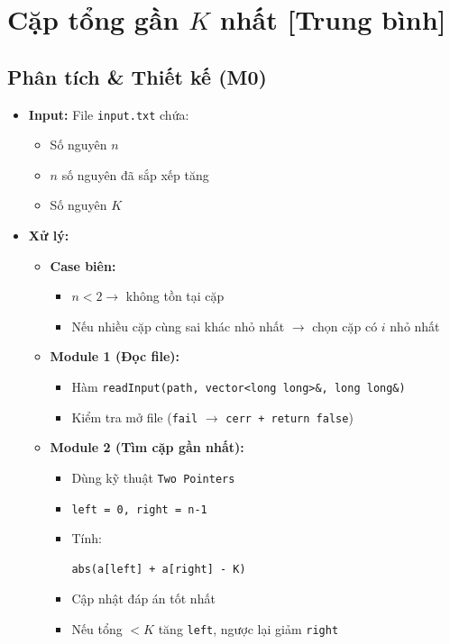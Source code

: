 \section{Cặp tổng gần $K$ nhất [Trung bình]}
\subsection{Phân tích \& Thiết kế (M0)}
\begin{itemize}
    \item \textbf{Input:}
    File \texttt{input.txt} chứa:
    \begin{itemize}
        \item Số nguyên $n$
        \item $n$ số nguyên đã sắp xếp tăng
        \item Số nguyên $K$
    \end{itemize}

    \item \textbf{Xử lý:}
    \begin{itemize}
        \item \textbf{Case biên:}
        \begin{itemize}
            \item $n < 2 \rightarrow$ không tồn tại cặp
            \item Nếu nhiều cặp cùng sai khác nhỏ nhất $\rightarrow$ chọn cặp có $i$ nhỏ nhất
        \end{itemize}

        \item \textbf{Module 1 (Đọc file):}
        \begin{itemize}
            \item Hàm \texttt{readInput(path, vector<long long>\&, long long\&)}
            \item Kiểm tra mở file (\texttt{fail} $\rightarrow$ \texttt{cerr + return false})
        \end{itemize}

        \item \textbf{Module 2 (Tìm cặp gần nhất):}
        \begin{itemize}
            \item Dùng kỹ thuật \texttt{Two Pointers}
            \item \texttt{left = 0, right = n-1}
            \item Tính:
\begin{lstlisting}
abs(a[left] + a[right] - K)
\end{lstlisting}
            \item Cập nhật đáp án tốt nhất
            \item Nếu tổng $< K$ tăng \texttt{left}, ngược lại giảm \texttt{right}
        \end{itemize}


\end{itemize}
\end{itemize}
